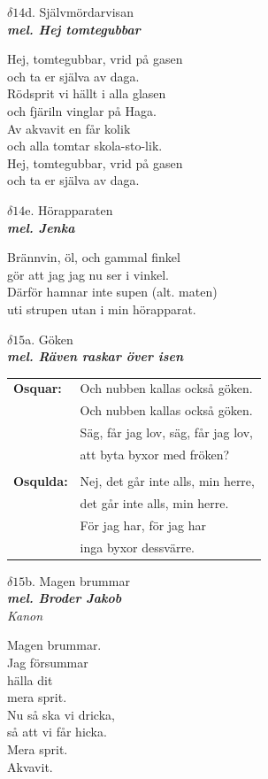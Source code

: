 \documentclass[a6paper,10pt]{article}
\newcommand{\mel}[1]{\small\textbf{\textit{mel. #1 \\}}}
\begin{document}
\newpage
\setlength{\oddsidemargin}{-0.47in}
\noindent
\begin{center}
\Large $\delta14$d. Självmördarvisan\\ 
\mel{Hej tomtegubbar}
\end{center}
Hej, tomtegubbar, vrid på gasen \\
och ta er själva av daga. \\
Rödsprit vi hällt i alla glasen \\
och fjäriln vinglar på Haga. \\
Av akvavit en får kolik \\
och alla tomtar skola-sto-lik. \\
Hej, tomtegubbar, vrid på gasen \\
och ta er själva av daga. 
\vspace{55pt}
\begin{center}
\Large $\delta14$e. Hörapparaten\\ 
\mel{Jenka}
\end{center}
Brännvin, öl, och gammal finkel \\
gör att jag jag nu ser i vinkel. \\
Därför hamnar inte supen (alt. maten) \\
uti strupen utan i min hörapparat. \\

\setlength{\oddsidemargin}{-0.37in}
\noindent
\begin{center}
\Large $\delta15$a. Göken\\ 
\mel{Räven raskar över isen}
\end{center}
\vspace{-10pt}
\begin{table}[!h]
\begin{tabularx}{0.85\textwidth}{l l}
\textbf{\small Osquar:} &\small Och nubben kallas också göken. \\
 &\small Och nubben kallas också göken. \\
 &\small Säg, får jag lov, säg, får jag lov, \\
 &\small att byta byxor med fröken? \\
&\\
\textbf{\small Osqulda:} &\small Nej, det går inte alls, min herre, \\ 
 &\small det går inte alls, min herre. \\
 &\small För jag har, för jag har \\
 &\small inga byxor dessvärre. 
\end{tabularx}
\end{table}
\vspace{20pt}
\begin{center}
\Large $\delta15$b. Magen brummar\\ 
\mel{Broder Jakob}
\textit{Kanon}
\end{center}
Magen brummar. \\
Jag försummar \\
hälla dit \\
mera sprit. \\
Nu så ska vi dricka, \\
så att vi får hicka. \\
Mera sprit. \\
Akvavit. 
\end{document}
